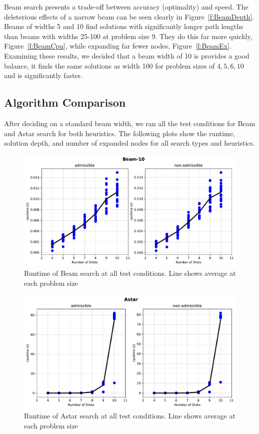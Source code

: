 \documentclass[12pt]{article}
\begin{document}
Beam search presents a trade-off between accuracy (optimality) and speed.
The deleterious effects of a narrow beam can be seen clearly in Figure~\ref{f:BeamDepth}.
Beams of widths 5 and 10 find solutions with significantly longer path lengths than beams with widths 25-100 at problem size 9.
They do this far more quickly, Figure~\ref{f:BeamCpu}, while expanding far fewer nodes, Figure~\ref{f:BeamEx}.
Examining these results, we decided that a beam width of 10 is provides a good balance, it finds the same solutions as width 100 for problem sizes of $4,5,6,10$ and is significantly faster.

\subsection{Algorithm Comparison}

After deciding on a standard beam width, we ran all the test conditions for Beam and Astar search for both heuristics.
The following plots show the runtime, solution depth, and number of expanded nodes for all search types and heuristics.

\begin{figure}[H]
	\centering
    \includegraphics[width=.9\textwidth]{FullCputimeBeam-10}	
	\caption{Runtime of Beam search at all test conditions. Line shows average at each problem size}
	\label{f:FullCpuBeam}
\end{figure}
\begin{figure}[H]
	\centering
    \includegraphics[width=.9\textwidth]{FullCputimeAstar}	
	\caption{Runtime of Astar search at all test conditions. Line shows average at each problem size}
	\label{f:FullCpuA}
\end{figure}
\end{document}
